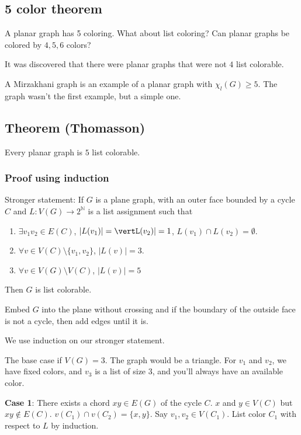 \documentclass[11pt]{article}
\def\N{\mathbb{N}}
\begin{document}
\subsection{5 color theorem}
\label{sec:org9f97378}
A planar graph has 5 coloring. What about list coloring? Can planar graphs be
colored by \(4, 5, 6\) colors?

It was discovered that there were planar graphs that were not \(4\) list
colorable.

A Mirzakhani graph is an example of a planar graph with \(\chi_l(G) \ge 5\).
The graph wasn't the first example, but a simple one.
\subsection{Theorem (Thomasson)}
\label{sec:orgd13c9b6}
Every planar graph is \(5\) list colorable.
\subsubsection{Proof using induction}
\label{sec:orgd32e71d}
Stronger statement: If \(G\) is a plane graph, with an outer face bounded by a
cycle \(C\) and \(L \colon V(G) \rightarrow 2^\N\) is a list assignment such
that
\begin{enumerate}
\item \(\exists v_1v_2 \in E(C)\), \(\vert L(v_1) \vert = \vertL(v_2)\vert = 1\),
\(L(v_1) \cap L(v_2) = \emptyset\).
\item \(\forall v \in V(C) \setminus\{v_1, v_2\}\), \(\vert L(v)\vert = 3\).
\item \(\forall v \in V(G) \setminus V(C)\), \(\vert L(v)\vert = 5\)
\end{enumerate}

Then \(G\) is list colorable.

Embed \(G\) into the plane without crossing and if the boundary of the outside
face is not a cycle, then add edges until it is.

We use induction on our stronger statement.

The base case if \(V(G) = 3\). The graph would be a triangle. For \(v_1\) and
\(v_2\), we have fixed colors, and \(v_3\) is a list of size \(3\), and you'll
always have an available color.

\textbf{Case 1}: There exists a chord \(xy \in E(G)\) of the cycle \(C\). \(x\) and \(y \in
    V(C)\) but \(xy \notin E(C)\). \(v(C_1) \cap v(C_2) = \{x, y\}\). Say \(v_1, v_2
    \in V(C_1)\). List color \(C_1\) with respect to \(L\) by induction.
\end{document}
